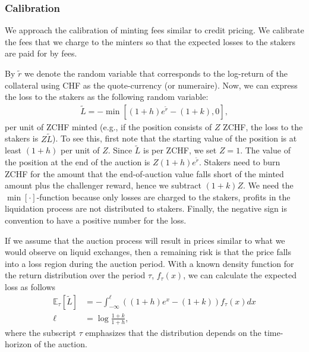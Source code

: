 \documentclass[english,11pt]{article}
\begin{document}
\subsubsection{Calibration}
We approach the calibration of minting fees similar to credit pricing. We calibrate the fees that we charge to the minters 
so that the expected losses to the stakers are paid for by fees.


By $\tilde{r}$ we denote the random variable that corresponds to the log-return of the collateral using CHF as the quote-currency (or numeraire).
Now, we can express the loss to the stakers as the following random variable:
\begin{align}
\tilde{L} = -\min\left[(1 + h) e^{\tilde{r}} - (1+k), 0\right],
\end{align}
per unit of ZCHF minted (e.g., if the position consists of $Z$ ZCHF, the loss to the stakers is $Z\tilde{L}$).
To see this, first note that the starting value of the position is at least $(1 + h)$ per unit of $Z$. Since $\tilde{L}$ is per ZCHF, we set $Z=1$.
The value of the position
at the end of the auction is $Z(1 + h) e^{\tilde{r}}$. Stakers need to burn ZCHF for the amount that the end-of-auction value falls short
of the minted amount plus the challenger reward, hence we subtract $(1+k)Z$. We need the $\min[\cdot]$-function because
only losses are charged to the stakers, profits in the liquidation process are not distributed to stakers. Finally, the negative sign is 
convention to have a positive number for the loss.

If we assume that the auction process will result in prices similar to what we would observe on liquid exchanges,
then a remaining risk is that the price falls into a loss region during the auction period.
With a known density function for the return distribution over the period $\tau$, $f_{\tau}(x)$, we can calculate the expected loss as follows
\begin{align}
\mathbb{E}_{\tau}\left[\tilde{L} \right] &= - \int_{-\infty}^{\ell} \left((1 + h) e^{x} - (1+k) \right) f_{\tau}(x) dx\label{eq:E}\\
\ell &= \log \frac{1+k}{1+h},
\end{align}
where the subscript $\tau$ emphasizes that the distribution depends on the time-horizon of the auction.
\end{document}
